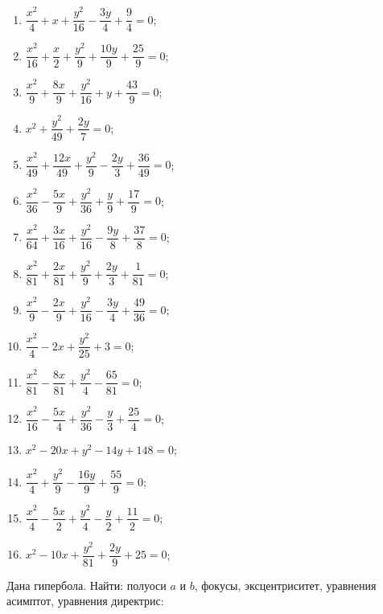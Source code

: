 	\begin{multicols}{2}
		\begin{enumerate}
			\setcounter{enumi}{\value{tasks}}

				\item \( \dfrac{x^2}{4} + x + \dfrac{y^2}{16} - \dfrac{3 y}{4} + \dfrac{9}{4} = 0 \);
				\item \( \dfrac{x^2}{16} + \dfrac{x}{2} + \dfrac{y^2}{9} + \dfrac{10 y}{9} + \dfrac{25}{9} = 0 \);
				\item \( \dfrac{x^2}{9} + \dfrac{8 x}{9} + \dfrac{y^2}{16} + y + \dfrac{43}{9} = 0 \);
				\item \( x^2 + \dfrac{y^2}{49} + \dfrac{2 y}{7} = 0 \);
				\item \( \dfrac{x^2}{49} + \dfrac{12 x}{49} + \dfrac{y^2}{9} - \dfrac{2 y}{3} + \dfrac{36}{49} = 0 \);
				\item \( \dfrac{x^2}{36} - \dfrac{5 x}{9} + \dfrac{y^2}{36} + \dfrac{y}{9} + \dfrac{17}{9} = 0 \);
				\item \( \dfrac{x^2}{64} + \dfrac{3 x}{16} + \dfrac{y^2}{16} - \dfrac{9 y}{8} + \dfrac{37}{8} = 0 \);
				\item \( \dfrac{x^2}{81} + \dfrac{2 x}{81} + \dfrac{y^2}{9} + \dfrac{2 y}{3} + \dfrac{1}{81} = 0 \);
				\item \( \dfrac{x^2}{9} - \dfrac{2 x}{9} + \dfrac{y^2}{16} - \dfrac{3 y}{4} + \dfrac{49}{36} = 0 \);
				\item \( \dfrac{x^2}{4} - 2 x + \dfrac{y^2}{25} + 3 = 0 \);
				\item \( \dfrac{x^2}{81} - \dfrac{8 x}{81} + \dfrac{y^2}{4} - \dfrac{65}{81} = 0 \);
				\item \( \dfrac{x^2}{16} - \dfrac{5 x}{4} + \dfrac{y^2}{36} - \dfrac{y}{3} + \dfrac{25}{4} = 0 \);
				\item \( x^2 - 20 x + y^2 - 14 y + 148 = 0 \);
				\item \( \dfrac{x^2}{4} + \dfrac{y^2}{9} - \dfrac{16 y}{9} + \dfrac{55}{9} = 0 \);
				\item \( \dfrac{x^2}{4} - \dfrac{5 x}{2} + \dfrac{y^2}{4} - \dfrac{y}{2} + \dfrac{11}{2} = 0 \);
				\item \( x^2 - 10 x + \dfrac{y^2}{81} + \dfrac{2 y}{9} + 25 = 0 \);

			\setcounter{tasks}{\value{enumi}}
		\end{enumerate}
	\end{multicols}

	\pagebreak
	Дана гипербола. Найти: полуоси $a$ и $b$, фокусы, эксцентриситет, уравнения асимптот, уравнения директрис:

